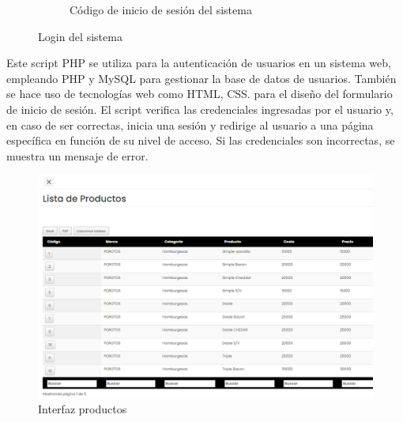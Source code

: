 \begin{figure}[H]
\begin{center}
\begin{subfigure}{0.62\textwidth}
            \caption{Código de inicio de sesión del sistema}
        \end{subfigure}
        \caption{Login del sistema}
        \label{fig:login}
    \end{center}
\end{figure}

Este script PHP se utiliza para la autenticación de usuarios en un sistema web, empleando PHP y MySQL para gestionar la base de datos de usuarios. También se hace uso de tecnologías web como HTML, CSS. para el diseño del formulario de inicio de sesión. El script verifica las credenciales ingresadas por el usuario y, en caso de ser correctas, inicia una sesión y redirige al usuario a una página específica en función de su nivel de acceso. Si las credenciales son incorrectas, se muestra un mensaje de error.


\begin{figure}[H]
    \begin{center}
      \includegraphics[scale=0.45]{./sistema/lista productos.png}
      \caption{Interfaz productos}
      \label{fig:product}
    \end{center}
  \end{figure}

